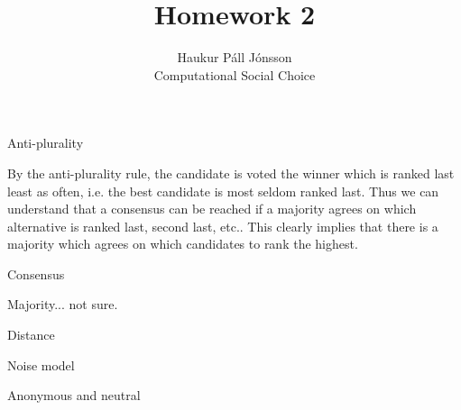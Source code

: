\documentclass[12pt]{article}
\newenvironment{question}[2][Question]{\begin{trivlist}
\item[\hskip \labelsep {\bfseries #1}\hskip \labelsep {\bfseries #2.}]}{\end{trivlist}}
\newenvironment{answer}[2][Answer]{\begin{trivlist}
\item[\hskip \labelsep {\bfseries #1}\hskip \labelsep {\bfseries #2:}]}{\end{trivlist}}
\begin{document}
\renewcommand{\theenumi}{\roman{enumi}}

\let\oldsum\sum
\renewcommand{\sum}[3]{\oldsum\limits_{#1}^{#2}#3}
\let\oldprod\prod
\renewcommand{\prod}[3]{\oldprod\limits_{#1}^{#2}#3}

\newcommand\Dunion{
  \mathop{\mathchoice
    {\ooalign{$\displaystyle\bigcup$\cr\hss\scalebox{.65}{\raisebox{0.45ex}{\sffamily +}}\hss}}
    {\ooalign{$\textstyle\bigcup$\cr\hss\scalebox{.9}{\raisebox{0.5ex}{\tiny\sffamily +}}\hss}}
    {\ooalign{$\scriptstyle\bigcup$\cr\hss\scalebox{.45}{\raisebox{0.3ex}{\sffamily +}}\hss}}
    {\ooalign{$\scriptscriptstyle\bigcup$\cr\hss\scalebox{.38}{\raisebox{0.3ex}{\sffamily +}}\hss}}
    }
}

\title{Homework 2}
\author{Haukur Páll Jónsson\\
Computational Social Choice}

\maketitle

\begin{question}{1}{Anti-plurality}

By the anti-plurality rule, the candidate is voted the winner which is ranked last least as often, i.e. the best candidate is most seldom ranked last. Thus we can understand that a consensus can be reached if a majority agrees on which alternative is ranked last, second last, etc.. This clearly implies that there is a majority which agrees on which candidates to rank the highest.
\end{question}

\begin{answer}{a)}{Consensus}

Majority... not sure.
\end{answer}

\begin{answer}{b)}{Distance}


\end{answer}

\begin{answer}{c)}{Noise model}


\end{answer}

\begin{question}{2}{Anonymous and neutral}

\end{question}
\end{document}
